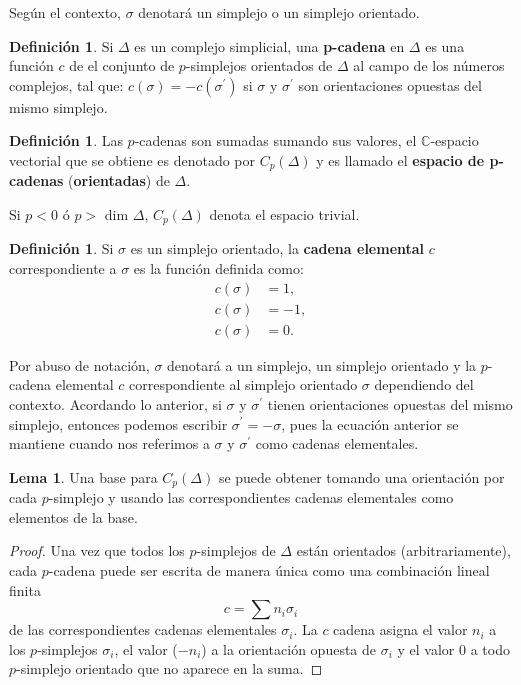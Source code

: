 \documentclass[12pt]{book}
\theoremstyle{definition}
\newtheorem{definition}[theorem]{Definición}
\newtheorem{lemma}[theorem]{Lema}
\newcounter{in}
\newcounter{ini}
\begin{document}
Según el contexto, $\sigma$ denotará un
simplejo o un simplejo orientado.


\begin{definition}
  \label{p_chain}
  Si $\Delta$ es un complejo simplicial, una \textbf{p-cadena} en
  $\Delta$ es una función $c$ de el conjunto de $p$-simplejos
  orientados de $\Delta$ al campo de los números complejos, tal que:
  $c(\sigma) = -c(\sigma^{'})$ si $\sigma$ y $\sigma^{'}$ son orientaciones
  opuestas del mismo simplejo.
\end{definition}
\begin{definition}
Las $p$-cadenas son sumadas sumando sus valores, el $\mathbb{C}$-espacio
vectorial que  se obtiene es denotado por $C_{p}(\Delta)$ y es llamado el
\textbf{espacio de p-cadenas} (\textbf{orientadas}) de $\Delta$. 
\end{definition}
Si $p < 0$ ó $p > $ dim $\Delta$, $C_{p}(\Delta)$ denota el espacio
trivial.
\begin{definition}
  \label{elementary_chain}
  Si $\sigma$ es un simplejo orientado, la \textbf{cadena elemental}
  $c$ correspondiente a $\sigma$ es la función definida como:
  \begin{equation}
    \label{eq:80}
     \begin{aligned}
    c(\sigma) &= 1,\\
    c(\sigma) &= -1, \\
    c(\sigma) &= 0.
  \end{aligned}
  \end{equation}
\end{definition}
Por abuso de notación, $\sigma$ denotará a un simplejo, un simplejo
orientado y la $p$-cadena elemental $c$ correspondiente al simplejo
orientado $\sigma$ dependiendo del contexto.  Acordando lo anterior,
si $\sigma$ y $\sigma^{'}$ tienen orientaciones opuestas del mismo
simplejo, entonces podemos escribir $\sigma^{'} = -\sigma$, pues la ecuación anterior
se mantiene cuando nos referimos a $\sigma$ y $\sigma^{'}$
como cadenas elementales.

\begin{lemma}
  \label{c_basis}
  Una base para $C_{p}(\Delta)$ se puede obtener tomando una
  orientación por cada $p$-simplejo y usando las correspondientes
  cadenas elementales como elementos de la base.
\end{lemma}

\begin{proof}
  Una vez que todos los $p$-simplejos de $\Delta$ están orientados
  (arbitrariamente), cada $p$-cadena puede ser escrita de manera única
  como una combinación lineal finita
\begin{equation}
  \label{eq:81}
  c = \sum n_{i}\sigma_{i}
\end{equation}
de las correspondientes cadenas elementales $\sigma_{i}$. La $c$ cadena
asigna el valor $n_{i}$ a los $p$-simplejos $\sigma_{i}$, el valor
($-n_{i}$) a la orientación opuesta de $\sigma_{i}$ y el valor $0$ a
todo $p$-simplejo orientado que no aparece en la suma.
\end{proof}
\end{document}
